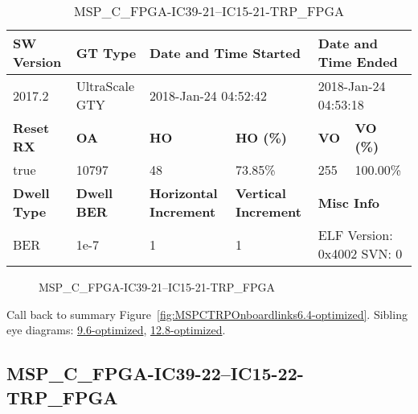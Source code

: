\begin{table}[h]
\centering
\caption{MSP\_C\_FPGA-IC39-21--IC15-21-TRP\_FPGA}
\label{tab:MSPCFPGAIC3921IC1521TRPFPGA6.4-optimized}
\begin{tabular}{@{}|l|l|l|l|l|l|@{}}
\toprule
\textbf{SW Version}                & \textbf{GT Type}   & \multicolumn{2}{l|}{\textbf{Date and Time Started}}            & \multicolumn{2}{l|}{\textbf{Date and Time Ended}}        \\ \midrule
2017.2                       & UltraScale GTY          & \multicolumn{2}{l|}{2018-Jan-24 04:52:42}                   & \multicolumn{2}{l|}{2018-Jan-24 04:53:18}               \\ \midrule
\textbf{Reset RX}                  & \textbf{OA} & \textbf{HO}   & \textbf{HO (\%)} & \textbf{VO} & \textbf{VO (\%)} \\ \midrule
true & 10797        & 48          & 73.85\%        & 255        & 100.00\%       \\ \midrule
\textbf{Dwell Type}                & \textbf{Dwell BER} & \textbf{Horizontal Increment} & \textbf{Vertical Increment}    & \multicolumn{2}{l|}{\textbf{Misc Info}}                  \\ \midrule
BER                            & 1e-7        & 1        & 1           & \multicolumn{2}{l|}{ELF Version: 0x4002 SVN: 0}                         \\ \bottomrule
\end{tabular}
\end{table}

\begin{figure}[h]
\caption{MSP\_C\_FPGA-IC39-21--IC15-21-TRP\_FPGA} \label{fig:MSPCFPGAIC3921IC1521TRPFPGA6.4-optimized}
\end{figure}

Call back to summary Figure~\ref{fig:MSPCTRPOnboardlinks6.4-optimized}.
Sibling eye diagrams: \hyperref[sec:MSPCFPGAIC3921IC1521TRPFPGA9.6-optimized]{9.6-optimized}, \hyperref[sec:MSPCFPGAIC3921IC1521TRPFPGA12.8-optimized]{12.8-optimized}.

\clearpage
\newpage


\subsection{MSP\_C\_FPGA-IC39-22--IC15-22-TRP\_FPGA}\label{sec:MSPCFPGAIC3922IC1522TRPFPGA6.4-optimized}

